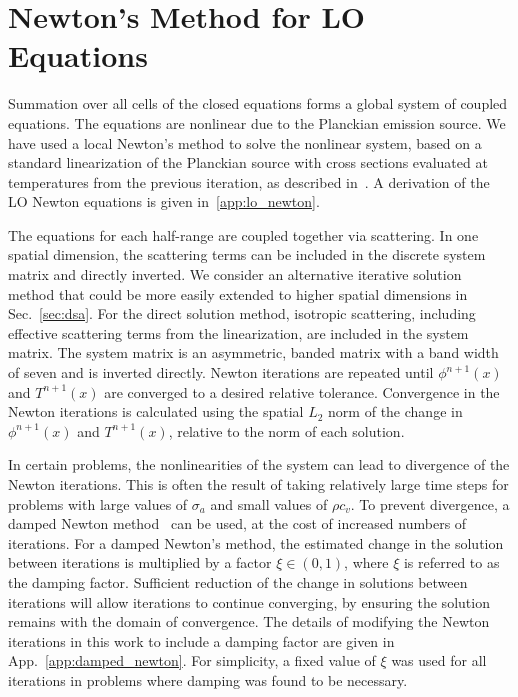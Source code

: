 \section{Newton's Method for LO Equations}
\label{sec:newton_overview}

Summation over all cells of the closed equations forms a global system of coupled equations.
The equations are nonlinear due to the Planckian emission source.  
We have used a local Newton's method to solve the nonlinear system, based on a standard linearization of the Planckian source with cross
sections evaluated at temperatures from the previous iteration, as described
in~\cite{morel_ldtrt}.  A derivation of the LO Newton equations is given
in~\ref{app:lo_newton}.

The equations for each half-range are coupled together via scattering.  
In one spatial dimension, the scattering terms can be included in the discrete system
matrix and directly inverted.  We consider an alternative iterative solution method that
could be more easily extended to higher spatial dimensions in Sec.~\ref{sec:dsa}.
For the direct solution method, isotropic scattering,
including effective scattering terms from the linearization, are included in the system matrix. The system
matrix is an asymmetric, banded matrix with a band width of seven and is inverted
directly. 
Newton iterations are repeated until $\phi^{n+1}(x)$ and $T^{n+1}(x)$ are converged
to a desired relative tolerance.  Convergence in the Newton iterations is calculated using the spatial $L_2$
norm of the change in $\phi^{n+1}(x)$ and $T^{n+1}(x)$, relative to the norm of each
solution.  

In certain problems, the nonlinearities of the system can lead to divergence of the Newton
iterations.  This is often the result of taking relatively large time steps for problems with large
values of $\sigma_a$ and small values of $\rho c_v$.  To prevent divergence, a damped
Newton method~\cite{damped_newton} can be used, at the cost of increased numbers of iterations.  For a
damped Newton's method, the estimated change in the solution between iterations is multiplied by a factor $\xi\in(0,1)$, where $\xi$ is referred to as the damping factor.
Sufficient reduction of the change in solutions between iterations will allow iterations
to continue converging, by ensuring the solution remains with the domain of convergence.  
The details of modifying the Newton iterations in this work to include a damping factor are given in
App.~\ref{app:damped_newton}.  For simplicity, a fixed value of $\xi$ was used for all
iterations in problems where damping was found to be necessary.

